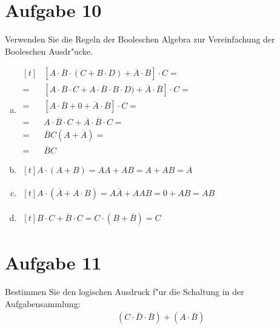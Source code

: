 \documentclass[10pt, oneside]{article}
\begin{document}
\section{Aufgabe 10}

Verwenden Sie die Regeln der Booleschen Algebra zur Vereinfachung der
Booleschen Ausdr"ucke.

\begin{enumerate}[(a)]
    \item $\begin{aligned}[t]
               &[A \cdot \overline{B} \cdot (C + B \cdot D) + \overline{A} \cdot \overline{B}] \cdot C = \\
            =\ &[A \cdot \overline{B} \cdot C + A \cdot \overline{B} \cdot B \cdot D) + \overline{A} \cdot \overline{B}] \cdot C = \\
            =\ &[A \cdot \overline{B} + 0 + \overline{A} \cdot \overline{B}] \cdot C = \\
            =\ &A \cdot \overline{B} \cdot C + \overline{A} \cdot \overline{B} \cdot C = \\
            =\ &\overline{B}C(A + \overline{A}) = \\
            =\ &\overline{B}C
        \end{aligned}$
    \item $\begin{aligned}[t]
            A \cdot (A + B) = AA + AB = A + AB = A
        \end{aligned}$
    \item $\begin{aligned}[t]
            A \cdot (\overline{A} + A \cdot B) = A\overline{A} + AAB = 0 + AB = AB
        \end{aligned}$
    \item $\begin{aligned}[t]
            B \cdot C + \overline{B} \cdot C = C \cdot (B + \overline{B}) = C
        \end{aligned}$
\end{enumerate}

\section{Aufgabe 11}

Bestimmen Sie den logischen Ausdruck f"ur die Schaltung in der Aufgabensammlung:
\begin{align*}
       &(C \cdot \overline{D} \cdot \overline{B}) + (A \cdot \overline{B})
\end{align*}
\end{document}
